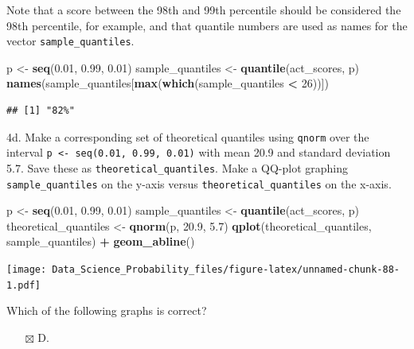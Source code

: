 \documentclass[
]{article}
\newenvironment{Shaded}{\begin{snugshade}}{\end{snugshade}}
\newcommand{\DecValTok}[1]{\textcolor[rgb]{0.00,0.00,0.81}{#1}}
\newcommand{\FloatTok}[1]{\textcolor[rgb]{0.00,0.00,0.81}{#1}}
\newcommand{\KeywordTok}[1]{\textcolor[rgb]{0.13,0.29,0.53}{\textbf{#1}}}
\newcommand{\NormalTok}[1]{#1}
\newcommand{\OperatorTok}[1]{\textcolor[rgb]{0.81,0.36,0.00}{\textbf{#1}}}
\newcommand{\StringTok}[1]{\textcolor[rgb]{0.31,0.60,0.02}{#1}}
\providecommand{\tightlist}{%
  \setlength{\itemsep}{0pt}\setlength{\parskip}{0pt}}
\begin{document}
Note that a score between the 98th and 99th percentile should be
considered the 98th percentile, for example, and that quantile numbers
are used as names for the vector \texttt{sample\_quantiles}.

\begin{Shaded}
\begin{Highlighting}[]
\NormalTok{p \textless{}{-}}\StringTok{ }\KeywordTok{seq}\NormalTok{(}\FloatTok{0.01}\NormalTok{, }\FloatTok{0.99}\NormalTok{, }\FloatTok{0.01}\NormalTok{)}
\NormalTok{sample\_quantiles \textless{}{-}}\StringTok{ }\KeywordTok{quantile}\NormalTok{(act\_scores, p)}
\KeywordTok{names}\NormalTok{(sample\_quantiles[}\KeywordTok{max}\NormalTok{(}\KeywordTok{which}\NormalTok{(sample\_quantiles }\OperatorTok{\textless{}}\StringTok{ }\DecValTok{26}\NormalTok{))])}
\end{Highlighting}
\end{Shaded}

\begin{verbatim}
## [1] "82%"
\end{verbatim}

4d. Make a corresponding set of theoretical quantiles using
\texttt{qnorm} over the interval
\texttt{p\ \textless{}-\ seq(0.01,\ 0.99,\ 0.01)} with mean 20.9 and
standard deviation 5.7. Save these as \texttt{theoretical\_quantiles}.
Make a QQ-plot graphing \texttt{sample\_quantiles} on the y-axis versus
\texttt{theoretical\_quantiles} on the x-axis.

\begin{Shaded}
\begin{Highlighting}[]
\NormalTok{p \textless{}{-}}\StringTok{ }\KeywordTok{seq}\NormalTok{(}\FloatTok{0.01}\NormalTok{, }\FloatTok{0.99}\NormalTok{, }\FloatTok{0.01}\NormalTok{)}
\NormalTok{sample\_quantiles \textless{}{-}}\StringTok{ }\KeywordTok{quantile}\NormalTok{(act\_scores, p)}
\NormalTok{theoretical\_quantiles \textless{}{-}}\StringTok{ }\KeywordTok{qnorm}\NormalTok{(p, }\FloatTok{20.9}\NormalTok{, }\FloatTok{5.7}\NormalTok{)}
\KeywordTok{qplot}\NormalTok{(theoretical\_quantiles, sample\_quantiles) }\OperatorTok{+}\StringTok{ }\KeywordTok{geom\_abline}\NormalTok{()}
\end{Highlighting}
\end{Shaded}

\texttt{[image: Data\_Science\_Probability\_files/figure-latex/unnamed-chunk-88-1.pdf]}

Which of the following graphs is correct?

\begin{itemize}
\tightlist
\item[$\boxtimes$]
  D.
\end{itemize}
\end{document}
